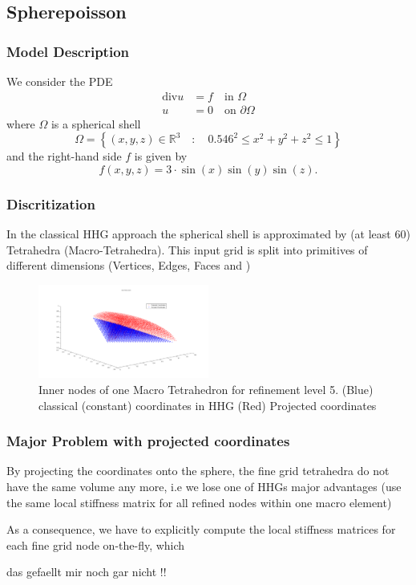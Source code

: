 \documentclass[t,compress=false,usepdftitle=false]{beamer}
\renewcommand{\div}{\mbox{div}}
\def\RR{\mathbb{R}}
\begin{document}
\subsection{Spherepoisson}
%
%
\begin{frame}\frametitle{Model Description}
We consider the PDE 
\begin{align*}
\div u &= f\quad \text{in }\Omega \\
     u &= 0\quad \text{on }\partial\Omega
\end{align*}
where $\Omega$ is a spherical shell
\begin{equation*}
\Omega = \left\{(x,y,z) \in\RR^3\quad:\quad 0.546^2 \leq x^2+y^2+z^2 \leq 1\right\}
\end{equation*}
and the right-hand side $f$ is given by
\begin{equation*}
f(x,y,z) = 3\cdot \sin(x)\sin(y)\sin(z).
\end{equation*}
%
\end{frame}
%
%
\begin{frame}\frametitle{Discritization}
In the classical HHG approach the spherical shell is approximated
by (at least 60) Tetrahedra (Macro-Tetrahedra).
This input grid is split into primitives of different dimensions 
(Vertices, Edges, Faces and )

\begin{figure}\centering
\includegraphics[width=0.5\textwidth]{macroTet_projected_constant_coords.png}
\caption{Inner nodes of one Macro Tetrahedron for refinement level 5. 
(Blue) classical (constant) coordinates in HHG 
(Red) Projected coordinates
}
\end{figure}



\end{frame}
%
%
\begin{frame}\frametitle{Major Problem with projected coordinates}
By projecting the coordinates onto the sphere, the fine grid tetrahedra
do not have the same volume any more, i.e we lose one of HHGs major advantages
(use the same local stiffness matrix for all refined nodes within one 
macro element)

As a consequence, we have to explicitly compute the local stiffness matrices
for each fine grid node on-the-fly, which 
   
   das gefaellt mir noch gar nicht !!



\end{frame}
\end{document}
